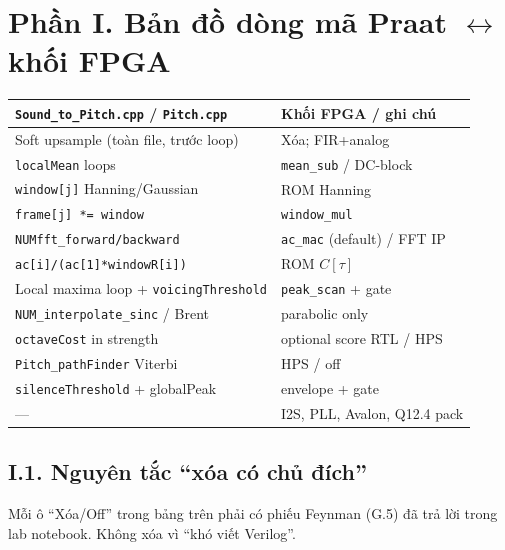\newpage
\section*{Phần I. Bản đồ dòng mã Praat $\leftrightarrow$ khối FPGA}

\begin{center}\footnotesize
\begin{tabular}{@{}p{5.5cm}p{6.5cm}@{}}
\toprule
\texttt{Sound\_to\_Pitch.cpp} / \texttt{Pitch.cpp} & Khối FPGA / ghi chú \\
\midrule
Soft upsample (toàn file, trước loop) & Xóa; FIR+analog \\
\texttt{localMean} loops & \texttt{mean\_sub} / DC-block \\
\texttt{window[j]} Hanning/Gaussian & ROM Hanning \\
\texttt{frame[j] *= window} & \texttt{window\_mul} \\
\texttt{NUMfft\_forward/backward} & \texttt{ac\_mac} (default) / FFT IP \\
\texttt{ac[i]/(ac[1]*windowR[i])} & ROM $C[\tau]$ \\
Local maxima loop + \texttt{voicingThreshold} & \texttt{peak\_scan} + gate \\
\texttt{NUM\_interpolate\_sinc} / Brent & parabolic only \\
\texttt{octaveCost} in strength & optional score RTL / HPS \\
\texttt{Pitch\_pathFinder} Viterbi & HPS / off \\
\texttt{silenceThreshold} + globalPeak & envelope + gate \\
--- & I2S, PLL, Avalon, Q12.4 pack \\
\bottomrule
\end{tabular}
\end{center}

\subsection*{I.1. Nguyên tắc ``xóa có chủ đích''}
Mỗi ô ``Xóa/Off'' trong bảng trên phải có phiếu Feynman (G.5) đã trả lời trong lab notebook. Không xóa vì ``khó viết Verilog''.
